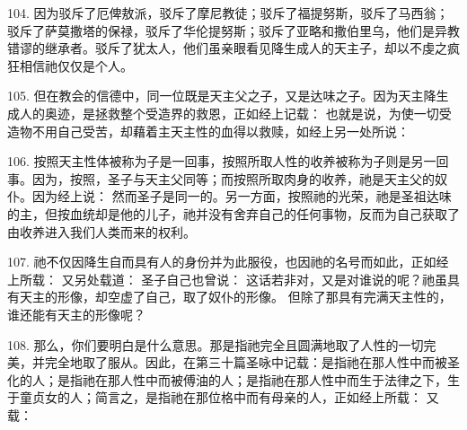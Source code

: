 104. 因为驳斥了厄俾敖派，驳斥了摩尼教徒；驳斥了福提努斯，驳斥了马西翁；驳斥了萨莫撒塔的保禄，驳斥了华伦提努斯；驳斥了亚略和撒伯里乌，他们是异教错谬的继承者。驳斥了犹太人，他们虽亲眼看见降生成人的天主子，却以不虔之疯狂相信祂仅仅是个人。\par

105. 但在教会的信德中，同一位既是天主父之子，又是达味之子。因为天主降生成人的奥迹，是拯救整个受造界的救恩，正如经上记载：  也就是说，为使一切受造物不用自己受苦，却藉着主天主性的血得以救赎，如经上另一处所说： \par

106. 按照天主性体被称为子是一回事，按照所取人性的收养被称为子则是另一回事。因为，按照，圣子与天主父同等；而按照所取肉身的收养，祂是天主父的奴仆。因为经上说：  然而圣子是同一的。另一方面，按照祂的光荣，祂是圣祖达味的主，但按血统却是他的儿子，祂并没有舍弃自己的任何事物，反而为自己获取了由收养进入我们人类而来的权利。\par

107. 祂不仅因降生自而具有人的身份并为此服役，也因祂的名号而如此，正如经上所载： 又另处载道：  圣子自己也曾说：  这话若非对，又是对谁说的呢？祂虽具有天主的形像，却空虚了自己，取了奴仆的形像。 但除了那具有完满天主性的，谁还能有天主的形像呢？\par

108. 那么，你们要明白是什么意思。那是指祂完全且圆满地取了人性的一切完美，并完全地取了服从。因此，在第三十篇圣咏中记载：是指祂在那人性中而被圣化的人；是指祂在那人性中而被傅油的人；是指祂在那人性中而生于法律之下，生于童贞女的人；简言之，是指祂在那位格中而有母亲的人，正如经上所载： 又载：\par

